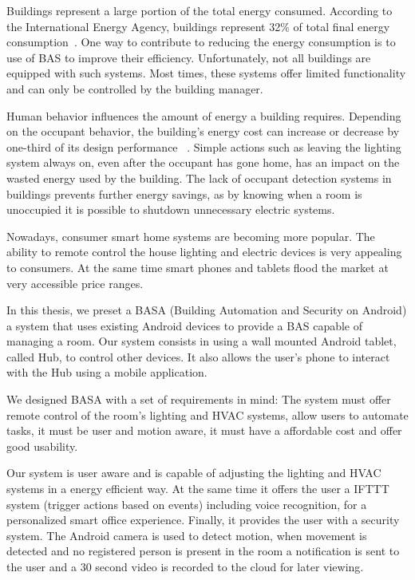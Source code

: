 \documentclass[conference]{IEEEtran}
\begin{document}
Buildings represent a large portion of the total energy consumed. According to the International Energy Agency, buildings represent 32\% of total final energy consumption~\cite{iea}. One way to contribute to reducing the energy consumption is to use of \ac{BAS} to improve their efficiency. Unfortunately, not all buildings are equipped with such systems. Most times, these systems offer limited functionality and can only be controlled by the building manager.

Human behavior influences the amount of energy a building requires. Depending on the occupant behavior, the building's energy cost can increase or decrease by one-third of its design performance ~\cite{ocupancy2}. Simple actions such as leaving the lighting system always on, even after the occupant has gone home, has an impact on the wasted energy used by the building. The lack of occupant detection systems in buildings prevents further energy savings, as by knowing when a room is unoccupied it is possible to shutdown unnecessary electric systems.

Nowadays, consumer smart home systems are becoming more popular. The ability to remote control the house lighting and electric devices is very appealing to consumers. At the same time smart phones and tablets flood the market at very accessible price ranges.

In this thesis, we preset a BASA (Building Automation and Security on Android) a system that uses existing Android devices to provide a \ac{BAS} capable of managing a room. Our system consists in using a wall mounted Android tablet, called Hub, to control other devices. It also allows the user's phone to interact with the Hub using a mobile application.

We designed BASA with a set of requirements in mind: The system must offer remote control of the room's lighting and \ac{HVAC} systems, allow users to automate tasks, it must be user and motion aware, it must have a affordable cost and offer good usability.

Our system is user aware and is capable of adjusting the lighting and \ac{HVAC} systems in a energy efficient way. At the same time it offers the user a \ac{IFTTT} system (trigger actions based on events) including voice recognition, for a personalized smart office experience. Finally, it provides the user with a security system. The Android camera is used to detect motion, when movement is detected and no registered person is present in the room a notification is sent to the user and a 30 second video is recorded to the cloud for later viewing.
\end{document}
